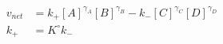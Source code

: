 \begin{eqnarray}
v_{net} & = k_+[A]^{\gamma_A}[B]^{\gamma_B} - k_-[C]^{\gamma_C}[D]^{\gamma_D} \\
k_+ &= K^\circ k_- \\
\end{eqnarray}